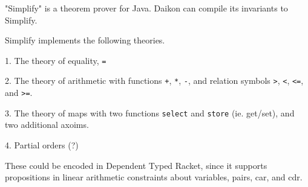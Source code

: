 "Simplify" is a theorem prover for Java. Daikon can compile its invariants
to Simplify.

Simplify implements the following theories.

1. The theory of equality, \texttt{=}

2. The theory of arithmetic with functions \texttt{+}, \texttt{*}, \texttt{-},
   and relation symbols \texttt{>}, \texttt{<}, \texttt{<=}, and \texttt{>=}.

3. The theory of maps with two functions \texttt{select} and \texttt{store} (ie. get/set),
   and two additional axoims.

4. Partial orders (?)

These could be encoded in Dependent Typed Racket, since it supports propositions
in linear arithmetic constraints about variables, pairs, car, and cdr.


